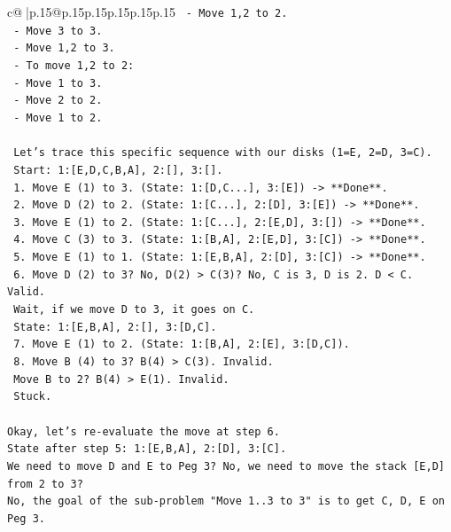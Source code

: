 \documentclass{article}
\begin{document}
{\begin{supertabular}{c@{$\;$}|p{.15\linewidth}@{}p{.15\linewidth}p{.15\linewidth}p{.15\linewidth}p{.15\linewidth}p{.15\linewidth}}
{{{\texttt{     {-} Move 1,2 to 2.} \\
\texttt{     {-} Move 3 to 3.} \\
\texttt{     {-} Move 1,2 to 3.} \\
\texttt{   {-} To move 1,2 to 2:} \\
\texttt{     {-} Move 1 to 3.} \\
\texttt{     {-} Move 2 to 2.} \\
\texttt{     {-} Move 1 to 2.} \\
\\ 
\texttt{   Let's trace this specific sequence with our disks (1=E, 2=D, 3=C).} \\
\texttt{   Start: 1:{[}E,D,C,B,A{]}, 2:{[}{]}, 3:{[}{]}.} \\
\texttt{   1. Move E (1) to 3. (State: 1:{[}D,C...{]}, 3:{[}E{]}) {-}> **Done**.} \\
\texttt{   2. Move D (2) to 2. (State: 1:{[}C...{]}, 2:{[}D{]}, 3:{[}E{]}) {-}> **Done**.} \\
\texttt{   3. Move E (1) to 2. (State: 1:{[}C...{]}, 2:{[}E,D{]}, 3:{[}{]}) {-}> **Done**.} \\
\texttt{   4. Move C (3) to 3. (State: 1:{[}B,A{]}, 2:{[}E,D{]}, 3:{[}C{]}) {-}> **Done**.} \\
\texttt{   5. Move E (1) to 1. (State: 1:{[}E,B,A{]}, 2:{[}D{]}, 3:{[}C{]}) {-}> **Done**.} \\
\texttt{   6. Move D (2) to 3? No, D(2) > C(3)? No, C is 3, D is 2. D < C. Valid.} \\
\texttt{      Wait, if we move D to 3, it goes on C.} \\
\texttt{      State: 1:{[}E,B,A{]}, 2:{[}{]}, 3:{[}D,C{]}.} \\
\texttt{   7. Move E (1) to 2. (State: 1:{[}B,A{]}, 2:{[}E{]}, 3:{[}D,C{]}).} \\
\texttt{   8. Move B (4) to 3? B(4) > C(3). Invalid.} \\
\texttt{      Move B to 2? B(4) > E(1). Invalid.} \\
\texttt{      Stuck.} \\
\\ 
\texttt{Okay, let's re{-}evaluate the move at step 6.} \\
\texttt{State after step 5: 1:{[}E,B,A{]}, 2:{[}D{]}, 3:{[}C{]}.} \\
\texttt{We need to move D and E to Peg 3? No, we need to move the stack {[}E,D{]} from 2 to 3?} \\
\texttt{No, the goal of the sub{-}problem "Move 1..3 to 3" is to get C, D, E on Peg 3.} \\
}}}
\end{supertabular}}
\end{document}
